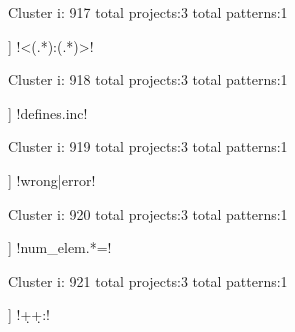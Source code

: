 Cluster i: 917
total projects:3
total patterns:1
\begin{multicols}{1}
\begin{description}[noitemsep,topsep=0pt]
\item [[3] ] \cverb!<(.*):(.*)>!
\end{description}
\end{multicols}







Cluster i: 918
total projects:3
total patterns:1
\begin{multicols}{1}
\begin{description}[noitemsep,topsep=0pt]
\item [[3] ] \cverb!defines.inc!
\end{description}
\end{multicols}







Cluster i: 919
total projects:3
total patterns:1
\begin{multicols}{1}
\begin{description}[noitemsep,topsep=0pt]
\item [[3] ] \cverb!wrong|error!
\end{description}
\end{multicols}







Cluster i: 920
total projects:3
total patterns:1
\begin{multicols}{1}
\begin{description}[noitemsep,topsep=0pt]
\item [[3] ] \cverb!num_elem.*=!
\end{description}
\end{multicols}







Cluster i: 921
total projects:3
total patterns:1
\begin{multicols}{1}
\begin{description}[noitemsep,topsep=0pt]
\item [[3] ] \cverb!\d+\s\d+:!
\end{description}
\end{multicols}







